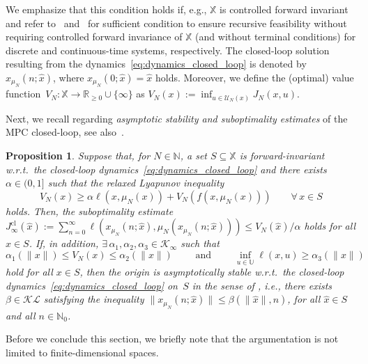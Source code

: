 \documentclass{article}
\numberwithin{equation}{section}
\newtheorem{proposition}[theorem]{Proposition}
\newcommand{\calU}{\mathcal U}
\newcommand{\bX}{\mathbb X}
\newcommand{\bU}{\mathbb U}
\begin{document}
	We emphasize that this condition holds if, e.g., $\bX$ is controlled forward invariant and refer to~\cite{BoccGrun14} and~\cite{EsteWort20} for sufficient condition to ensure recursive feasibility without requiring controlled forward invariance of $\bX$ (and without terminal conditions) for discrete and continuous-time systems, respectively. 
	The closed-loop solution resulting from the dynamics~\eqref{eq:dynamics_closed_loop} is denoted by $x_{\mu_N}(n;\hat{x})$, where $x_{\mu_N}(0;\hat{x}) = \hat{x}$ holds. 
	Moreover, we define the (optimal) value function~$V_N: \bX \rightarrow \mathbb{R}_{\geq 0} \cup \{ \infty \}$ as $V_N(x) := \inf_{u \in \calU_N(x)} J_N(x,u)$.
	
	Next, we recall \cite[Theorem~4.11]{GrunPann17} regarding \emph{asymptotic stability and suboptimality estimates} of the MPC closed-loop, see also~\cite{GrunRant08}.
	\begin{proposition}\label{thm:stability_suboptimality}
		Suppose that, for $N \in \mathbb{N}$, 
		a set $S \subseteq \mathbb{X}$ is forward-invariant w.r.t.\ the closed-loop dynamics~\eqref{eq:dynamics_closed_loop} and there exists $\alpha \in (0,1]$ such that the \emph{relaxed Lyapunov inequality}
		\begin{equation}\label{eq:inequality_DP_relaxed_DP}
		V_N(x) \geq \alpha \ell(x,\mu_N(x)) + V_N(f(x,\mu_N(x))) \qquad\forall\,x \in S
		\end{equation}
		holds. Then, the suboptimality estimate $J_\infty^{\operatorname{cl}}(\hat{x}) := \sum_{n=0}^\infty \ell(x_{\mu_N}(n;\hat{x}), \mu_N(x_{\mu_N}(n;\hat{x}))) \leq V_N(\hat{x}) / \alpha$ holds for all $\hat{x} \in S$. If, in addition, $\exists\,\alpha_1, \alpha_2, \alpha_3 \in \mathcal{K}_\infty$ such that
		\begin{equation}\nonumber
		\alpha_1( \| x \| ) \leq V_N(x) \leq \alpha_2( \| x \|) \qquad\text{ and }\qquad \inf_{u \in \bU} \ell(x,u) \geq \alpha_3( \| x \|)
		\end{equation}
		hold for all $x \in S$, then the origin is asymptotically stable w.r.t.\ the closed-loop dynamics~\eqref{eq:dynamics_closed_loop} on~$S$ in the sense of \cite[Definition~2.16]{GrunPann17}, i.e., there exists $\beta \in \mathcal{KL}$ satisfying the inequality $\| x_{\mu_N}(n;\hat{x}) \| \leq \beta(\| \hat{x} \|,n)$, for all $\hat{x} \in S$ and all $n \in \mathbb{N}_0$.
	\end{proposition}
	\noindent Before we conclude this section, we briefly note that the argumentation is not limited to finite-dimensional spaces.
	
\end{document}
